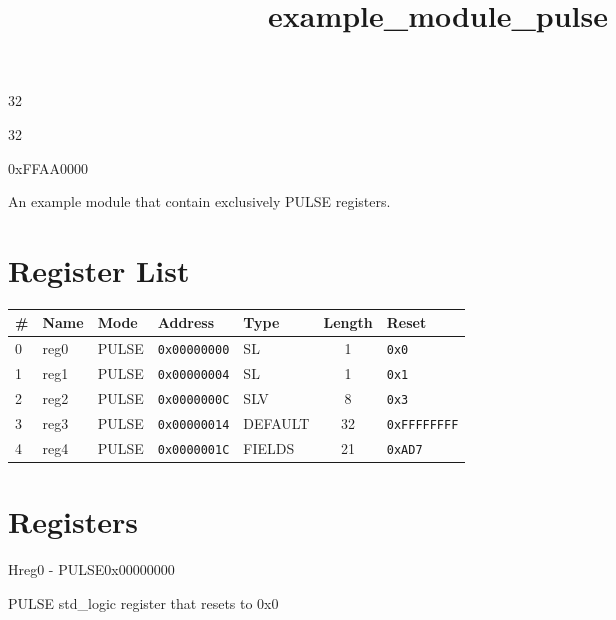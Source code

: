 \documentclass{article}
\title{example{\_}module{\_}pulse}
\author{}
\date{}
\begin{document}
\maketitle

\begin{description}[leftmargin=!,labelwidth=\widthof{\bfseries Address width: }]
\item [Address width: ] 32
\item [Data width: ] 32
\item [Base address: ] 0xFFAA0000
\end{description}


An example module that contain exclusively PULSE registers.

\section{Register List}

\begin{table}[h!]
  \begin{center}
    \label{tab:table1}
    \begin{tabularx}{\linewidth}{|l|X|l|l|l|c|l|}
      \hline
      \textbf{\#} & \textbf{Name} & \textbf{Mode} & \textbf{Address} & \textbf{Type} & \textbf{Length} &
      \textbf{Reset} \\
      \hline
      0 & reg0 & PULSE & \texttt{0x00000000} & SL & 1 & \texttt{0x0} \\
      \hline
      1 & reg1 & PULSE & \texttt{0x00000004} & SL & 1 & \texttt{0x1} \\
      \hline
      2 & reg2 & PULSE & \texttt{0x0000000C} & SLV & 8 & \texttt{0x3} \\
      \hline
      3 & reg3 & PULSE & \texttt{0x00000014} & DEFAULT & 32 & \texttt{0xFFFFFFFF} \\
      \hline
      4 & reg4 & PULSE & \texttt{0x0000001C} & FIELDS & 21 & \texttt{0xAD7} \\
      \hline
    \end{tabularx}
  \end{center}
\end{table}

\section{Registers}

\begin{register}{H}{reg0 - PULSE}{0x00000000}
  \par PULSE std{\_}logic register that resets to 0x0 \regnewline
  \label{reg0}
\regnewline
\end{register}
\end{document}
